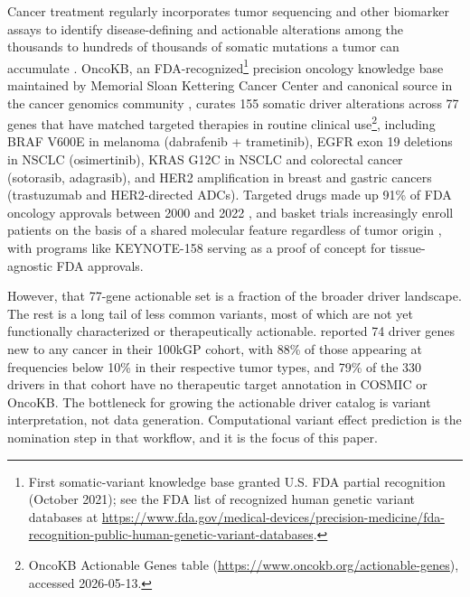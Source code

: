 \documentclass{article}
\begin{document}
Cancer treatment regularly incorporates tumor sequencing and other biomarker
assays \citep{berger2018genomics, hadi2026gos} to identify disease-defining and actionable alterations among the thousands to
hundreds of thousands of somatic mutations a tumor can accumulate
\citep{kinnersley2024wgs}. OncoKB, an FDA-recognized\footnote{First somatic-variant knowledge base granted U.S. FDA partial recognition (October 2021); see the FDA list of recognized human genetic variant databases at \url{https://www.fda.gov/medical-devices/precision-medicine/fda-recognition-public-human-genetic-variant-databases}.} precision oncology knowledge base maintained
by Memorial Sloan Kettering Cancer Center and canonical source in the cancer genomics community \citep{chakravarty2017oncokb}, curates 155 somatic driver
alterations across 77 genes that have matched targeted therapies
in routine clinical use\footnote{OncoKB Actionable Genes table (\url{https://www.oncokb.org/actionable-genes}), accessed 2026-05-13.}, including BRAF V600E in melanoma
(dabrafenib + trametinib), EGFR exon 19 deletions in NSCLC (osimertinib),
KRAS G12C in NSCLC and colorectal cancer (sotorasib, adagrasib), and HER2
amplification in breast and gastric cancers (trastuzumab and HER2-directed
ADCs). Targeted drugs made up 91\% of FDA oncology approvals
between 2000 and 2022 \citep{scott2023fdatrends}, and basket trials
increasingly enroll patients on the basis of a shared molecular feature
regardless of tumor origin \citep{bartoszkiewicz2026basket}, with programs
like KEYNOTE-158 \citep{marabelle2020keynote158} serving as a proof of concept for
tissue-agnostic FDA approvals. 

However, that 77-gene actionable set is a fraction of the broader
driver landscape. The rest is a long tail of less common variants, most
of which are not yet functionally characterized or therapeutically
actionable. \citet{kinnersley2024wgs} reported 74 driver genes new to
any cancer in their 100kGP cohort, with 88\% of those appearing at
frequencies below 10\% in their respective tumor types, and 79\% of
the 330 drivers in that cohort have no therapeutic target annotation
in COSMIC or OncoKB. The bottleneck for growing the actionable driver
catalog is variant interpretation, not data generation. Computational
variant effect prediction is the nomination step in that workflow, and
it is the focus of this paper.
\end{document}
